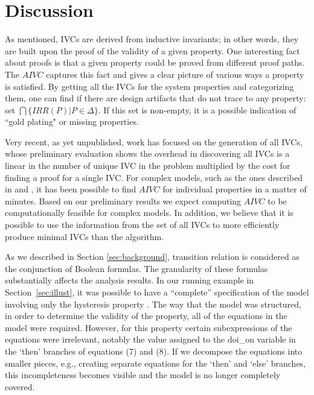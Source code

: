 \section{Discussion}
\label{sec:discussion}
As mentioned, IVCs are derived from inductive invariants; in other words, they are built upon the proof of the validity of a given property. One interesting fact about proofs
  is that a given property could be proved from different proof paths.
  The $AIVC$ captures this fact and gives a clear picture of various ways a property is satisfied. By getting all the IVCs for the system properties and categorizing them, one can find if there are design artifacts that do not trace to any property: set $\bigcap \{IRR (P) | P \in \Delta \}$.  If this set is non-empty, it is a possible indication of ``gold plating" or missing properties.

Very recent, as yet unpublished, work has focused on the
generation of all IVCs, whose preliminary evaluation
shows the overhead in discovering all IVCs is a linear in the
number of unique IVC in the problem multiplied by the cost
for finding a proof for a single IVC. For complex models, such
as the ones described in \cite {QFCS15:backes} and \cite{hilt2013}, it has been possible to
find $AIVC$ for individual properties in a matter of minutes.
Based on our preliminary results we expect computing $AIVC$ to be computationally feasible for complex models. In
addition, we believe that it is possible to use the information
from the set of all IVCs to more efficiently produce minimal
IVCs than the \ucbfalg algorithm.

As we described in Section \ref{sec:background}, transition relation is considered
as the conjunction of Boolean formulas. The granularity of these formulas substantially affects the analysis results.  In our running example in Section~\ref{sec:illust}, it was possible to have a ``complete'' specification of the model involving only the hysteresis property \hystp.  The way that the model was structured, in order to determine the validity of the property, all of the equations in the model were required.  However, for this property certain subexpressions of the equations were irrelevant, notably the value assigned to the doi\_on variable in the `then' branches of equations (7) and (8).  If we decompose the equations into smaller pieces, e.g., creating separate equations for the `then' and `else' branches, this incompleteness becomes visible and the model is no longer completely covered.


